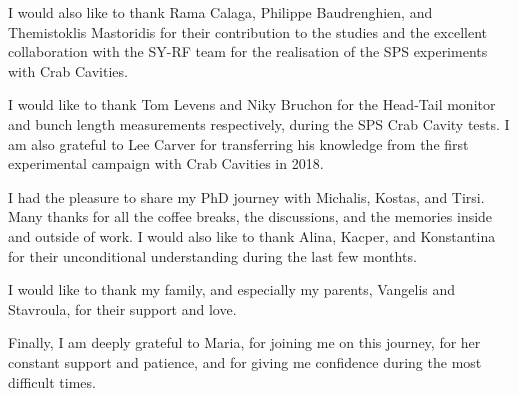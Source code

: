 I would also like to thank Rama Calaga, Philippe Baudrenghien, and Themistoklis Mastoridis for their contribution to the studies and the excellent collaboration with the SY-RF team for the realisation of the SPS experiments with Crab Cavities.

I would like to thank Tom Levens and Niky Bruchon for the Head-Tail monitor and bunch length measurements respectively, during the SPS Crab Cavity tests. I am also grateful to Lee Carver for transferring his knowledge from the first experimental campaign with Crab Cavities in 2018.

I had the pleasure to share my PhD journey with Michalis, Kostas, and Tirsi. Many thanks for all the coffee breaks, the discussions, and the memories inside and outside of work. I would also like to thank Alina, Kacper, and Konstantina for their unconditional understanding during the last few monthts. 

I would like to thank my family, and especially my parents, Vangelis and Stavroula, for their support and love.

Finally, I am deeply grateful to Maria, for joining me on this journey, for her constant support and patience, and for giving me confidence during the most difficult times. %